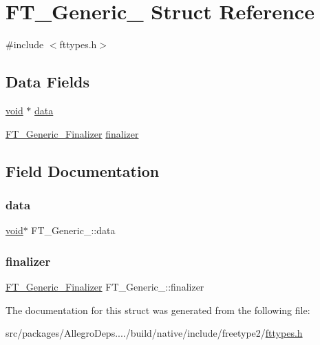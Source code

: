 \hypertarget{struct_f_t___generic__}{}\section{F\+T\+\_\+\+Generic\+\_\+ Struct Reference}
\label{struct_f_t___generic__}


{\ttfamily \#include $<$fttypes.\+h$>$}

\subsection*{Data Fields}
\begin{DoxyCompactItemize}
\item 
\hyperlink{png_8h_ac9c84fa68bbad002983e35ce3663c686}{void} $\ast$ \hyperlink{struct_f_t___generic___af0bf8b983254b662f293e9a20505e27e}{data}
\item 
\hyperlink{fttypes_8h_a9f7f3174a89e80b1d9eff58620121b3f}{F\+T\+\_\+\+Generic\+\_\+\+Finalizer} \hyperlink{struct_f_t___generic___a20fce8de90cc9e3876935817247b9ccc}{finalizer}
\end{DoxyCompactItemize}


\subsection{Field Documentation}
\mbox{\label{struct_f_t___generic___af0bf8b983254b662f293e9a20505e27e}} 
\subsubsection{\texorpdfstring{data}{data}}
{\footnotesize\ttfamily \hyperlink{png_8h_ac9c84fa68bbad002983e35ce3663c686}{void}$\ast$ F\+T\+\_\+\+Generic\+\_\+\+::data}

\mbox{\label{struct_f_t___generic___a20fce8de90cc9e3876935817247b9ccc}} 
\subsubsection{\texorpdfstring{finalizer}{finalizer}}
{\footnotesize\ttfamily \hyperlink{fttypes_8h_a9f7f3174a89e80b1d9eff58620121b3f}{F\+T\+\_\+\+Generic\+\_\+\+Finalizer} F\+T\+\_\+\+Generic\+\_\+\+::finalizer}



The documentation for this struct was generated from the following file\+:\begin{DoxyCompactItemize}
\item 
src/packages/\+Allegro\+Deps..../build/native/include/freetype2/\hyperlink{fttypes_8h}{fttypes.\+h}\end{DoxyCompactItemize}
